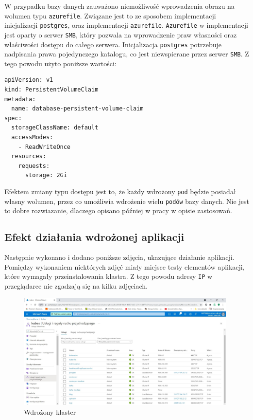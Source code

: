 \documentclass[12pt,twoside]{article}
\begin{document}
W przypadku bazy danych zauważono niemożliwość wprowadzenia obrazu na wolumen typu \texttt{azurefile}. Związane jest to ze sposobem implementacji inicjalizacji \texttt{postgres}, oraz implementacji \texttt{azurefile}. \texttt{Azurefile} w implementacji jest oparty o serwer \texttt{SMB}, który pozwala na wprowadzenie praw własności oraz właściwości dostępu do całego serwera. Inicjalizacja \texttt{postgres} potrzebuje nadpisania prawa pojedynczego katalogu, co jest niewspierane przez serwer \texttt{SMB}. Z tego powodu użyto poniższe wartości:

  \begin{lstlisting}
apiVersion: v1
kind: PersistentVolumeClaim
metadata:
  name: database-persistent-volume-claim
spec:
  storageClassName: default
  accessModes:
    - ReadWriteOnce
  resources:
    requests:
      storage: 2Gi
 \end{lstlisting}
 
 Efektem zmiany typu dostępu jest to, że każdy wdrożony \texttt{pod} będzie posiadał własny wolumen, przez co umożliwia wdrożenie wielu \texttt{podów} bazy danych. Nie jest to dobre rozwiazanie, dlaczego opisano później w pracy w opisie zastosowań.
\subsection{Efekt działania wdrożonej aplikacji}
Następnie wykonano i dodano poniższe zdjęcia, ukazujące działanie aplikacji. Pomiędzy wykonaniem niektórych zdjęć miały miejsce testy elementów aplikacji, które wymagały przeinstalowania klastra. Z tego powodu adresy \texttt{IP} w przeglądarce nie zgadzają się na kilku zdjęciach. \begin{figure}[ht]
	\centering
	\includegraphics[width=11cm]{figures/klaster.jpg}
	\caption{Wdrożony klaster}
\label{Fig:cluster}
\end{figure}
\end{document}
